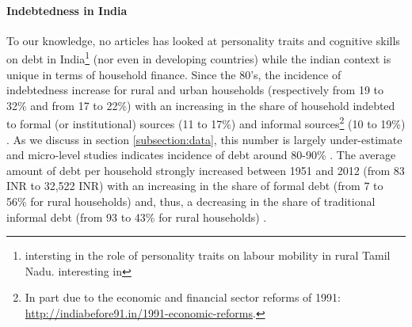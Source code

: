 \documentclass[a4paper, 11pt, onecolumn]{article}
\begin{document}
\paragraph{Indebtedness in India}
To our knowledge, no articles has looked at personality traits and cognitive skills on debt in India\footnote{\cite{Michiels2021} intersting in the role of personality traits on labour mobility in rural Tamil Nadu. \cite{Dasgupta2020} interesting in } (nor even in developing countries) while the indian context is unique in terms of household finance.
Since the 80's, the incidence of indebtedness increase for rural and urban households (respectively from 19 to 32\% and from 17 to 22\%) with an increasing in the share of household indebted to formal (or institutional) sources (11 to 17\%) and informal sources\footnote{In part due to the economic and financial sector reforms of 1991: \url{http://indiabefore91.in/1991-economic-reforms}.} (10 to 19\%) \citep{Rajakumar2019}.
As we discuss in section \ref{subsection:data}, this number is largely under-estimate \citep{Jones1994} and micro-level studies indicates incidence of debt around 80-90\% \citep{Guerin2013a, Jones1994, Dreze1997, Reboul2021}.
The average amount of debt per household strongly increased between 1951 and 2012 (from 83 INR to 32,522 INR) with an increasing in the share of formal debt (from 7 to 56\% for rural households) and, thus, a decreasing in the share of traditional informal debt (from 93 to 43\% for rural households) \citep{Rajakumar2019}.



\end{document}
